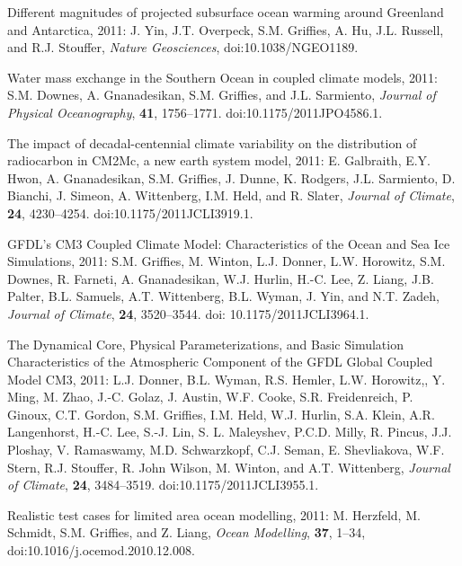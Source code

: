\begin{etaremune}
\item Different magnitudes of projected subsurface ocean warming  around Greenland and Antarctica, 2011: J. Yin, J.T. Overpeck, S.M. Grif\/f\/ies, A. Hu, J.L. Russell, and R.J. Stouffer, {\it  Nature Geosciences}, doi:10.1038/NGEO1189.

\item Water mass exchange in the Southern Ocean in coupled climate  models, 2011: S.M. Downes, A. Gnanadesikan, S.M. Grif\/f\/ies,  and J.L. Sarmiento, {\it Journal of Physical Oceanography}, {\bf
    41}, 1756--1771.  doi:10.1175/2011JPO4586.1.

\item The impact of decadal-centennial climate variability on the  distribution of radiocarbon in CM2Mc, a new earth system model,  2011: E. Galbraith, E.Y. Hwon, A. Gnanadesikan, S.M. Grif\/f\/ies, J. Dunne, K. Rodgers, J.L. Sarmiento, D. Bianchi, J. Simeon, A. Wittenberg, I.M. Held, and R.  Slater, {\it Journal of Climate}, {\bf 24}, 4230--4254. doi:10.1175/2011JCLI3919.1.

\item GFDL's CM3 Coupled Climate Model: Characteristics of the Ocean  and Sea Ice Simulations, 2011: S.M. Grif\/f\/ies, M. Winton,  L.J. Donner, L.W. Horowitz, S.M. Downes, R.  Farneti,  A. Gnanadesikan, W.J. Hurlin, H.-C. Lee, Z. Liang, J.B. Palter,  B.L. Samuels, A.T. Wittenberg, B.L. Wyman, J.  Yin, and N.T. Zadeh,
  {\it Journal of Climate}, {\bf 24}, 3520--3544.  doi:
  10.1175/2011JCLI3964.1.

\item The Dynamical Core, Physical Parameterizations, and Basic Simulation Characteristics of the Atmospheric Component of the GFDL Global Coupled Model CM3, 2011: L.J. Donner, B.L. Wyman, R.S. Hemler, L.W. Horowitz,, Y. Ming, M. Zhao, J.-C. Golaz, J. Austin, W.F. Cooke, S.R. Freidenreich, P. Ginoux, C.T. Gordon, S.M. Grif\/f\/ies, I.M. Held, W.J. Hurlin, S.A. Klein, A.R. Langenhorst, H.-C. Lee, S.-J. Lin, S. L. Maleyshev, P.C.D. Milly, R. Pincus, J.J. Ploshay, V. Ramaswamy, M.D. Schwarzkopf, C.J. Seman, E. Shevliakova, W.F. Stern, R.J. Stouﬀer, R. John Wilson, M.  Winton, and A.T. Wittenberg, {\it Journal of Climate}, {\bf 24}, 3484--3519. 
  doi:10.1175/2011JCLI3955.1.

\item Realistic test cases for limited area ocean modelling, 2011: M. Herzfeld, M. Schmidt, S.M. Grif\/f\/ies, and Z. Liang, {\it    Ocean Modelling}, {\bf 37}, 1--34, doi:10.1016/j.ocemod.2010.12.008.


\end{etaremune}
